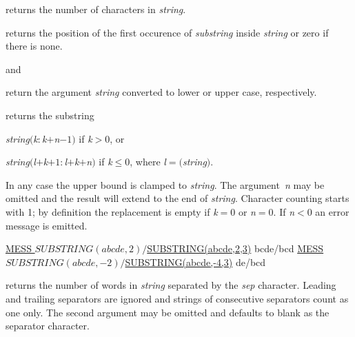 \begin{UL}

\item
{} returns the number of characters in
\textsl{string}.

\item
{} returns the position
of the first occurence of \textsl{substring} inside \textsl{string} or
zero if there is none.

\item
{} and

\item
{} return the argument \textsl{string}
converted to lower or upper case, respectively.

\item
{} returns
the substring
\begin{ULc}
\item
\textsl{string}$($\textsl{k}$:$\textsl{k}$+$\textsl{n}$-1)$ 
if \textsl{k}$>0$, or
\item
\textsl{string}$($\textsl{l}$+$\textsl{k}$+1:$\textsl{l}$+$\textsl{k}$+$\textsl{n}$)$
if \textsl{k}$\le0$, where \textsl{l}$=$$($\textsl{string}$)$.
\end{ULc}
In any case the upper bound is clamped to \textsl{string}\Lit{)}.
The argument~\textsl{n} may be omitted and the result will extend to the end
of \textsl{string}.
Character counting starts with 1; by definition the replacement is empty
if \textsl{k}$=0$ or \textsl{n}$=0$.
If \textsl{n}$<0$ an error message is emitted.
\begin{XMP}
\PROMPT{} \underline{MESS $SUBSTRING(abcde,2)/$SUBSTRING(abcde,2,3)}
 bcde/bcd
\PROMPT{} \underline{MESS $SUBSTRING(abcde,-2)/$SUBSTRING(abcde,-4,3)}
 de/bcd
\vspace{-.5cm}
\end{XMP}

\item
{} returns the number of
words in \textsl{string} separated by the \textsl{sep} character.
Leading and trailing separators are ignored and strings of consecutive
separators count as one only.
The second argument may be omitted and defaults to blank as the
separator character.


\end{UL}
